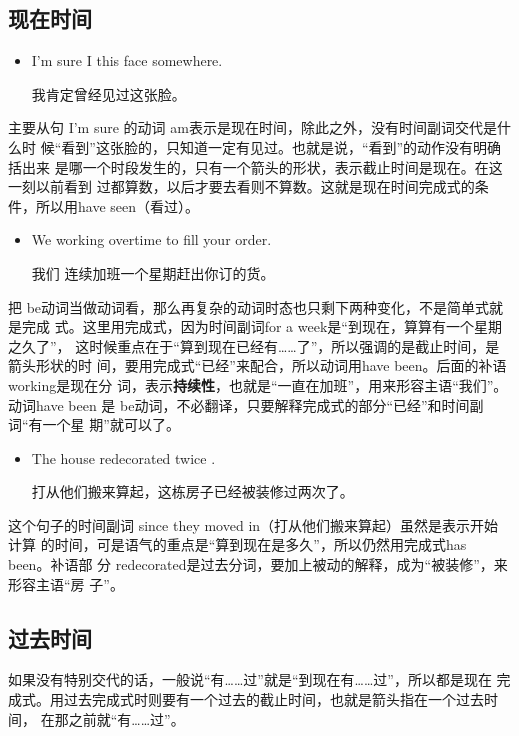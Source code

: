 \subsection{现在时间}
\begin{itemize}
\item  I'm sure I  this face somewhere.

  我肯定曾经见过这张脸。
\end{itemize}

主要从句 I'm sure 的动词 am表示是现在时间，除此之外，没有时间副词交代是什么时
候“看到”这张脸的，只知道一定有见过。也就是说，“看到”的动作没有明确括出来
是哪一个时段发生的，只有一个箭头的形状，表示截止时间是现在。在这一刻以前看到
过都算数，以后才要去看则不算数。这就是现在时间完成式的条件，所以用have
seen（看过）。

\begin{itemize}
\item We  working overtime  to fill your order.

我们
  连续加班一个星期赶出你订的货。
\end{itemize}

把 be动词当做动词看，那么再复杂的动词时态也只剩下两种变化，不是简单式就是完成
式。这里用完成式，因为时间副词for a week是“到现在，算算有一个星期之久了”，
这时候重点在于“算到现在已经有……了”，所以强调的是截止时间，是箭头形状的时
间，要用完成式“已经”来配合，所以动词用have been。后面的补语 working是现在分
词，表示\textbf{持续性}，也就是“一直在加班”，用来形容主语“我们”。动词have
been 是 be动词，不必翻译，只要解释完成式的部分“已经”和时间副词“有一个星
期”就可以了。

\begin{itemize}
\item  The house  redecorated twice .

  打从他们搬来算起，这栋房子已经被装修过两次了。
\end{itemize}

这个句子的时间副词 since they moved in（打从他们搬来算起）虽然是表示开始计算
的时间，可是语气的重点是“算到现在是多久”，所以仍然用完成式has been。补语部
分 redecorated是过去分词，要加上被动的解释，成为“被装修”，来形容主语“房
子”。

\subsection{过去时间}

如果没有特别交代的话，一般说“有……过”就是“到现在有……过”，所以都是现在
完成式。用过去完成式时则要有一个过去的截止时间，也就是箭头指在一个过去时间，
在那之前就“有……过”。

